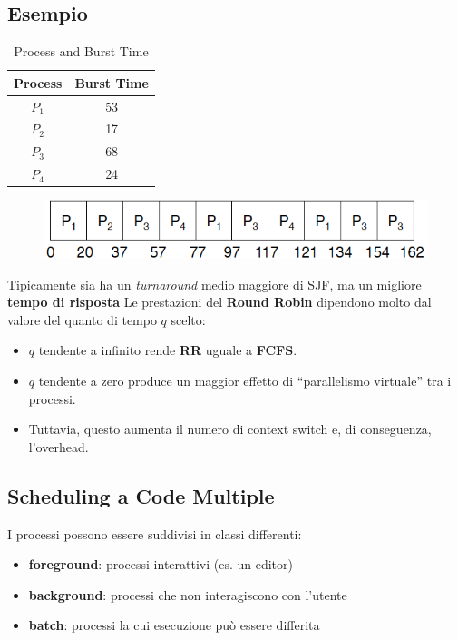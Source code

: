 \subsection{Esempio}
\begin{table}[h]
    \centering
    \begin{tabular}{|c|c|}
        \hline
        \textbf{Process} & \textbf{Burst Time} \\
        \hline
        $P_1$ & 53 \\
        $P_2$ & 17 \\
        $P_3$ & 68 \\
        $P_4$ & 24 \\
        \hline
    \end{tabular}
    \caption{Process and Burst Time}
    \label{tab:process_burst_time}
\end{table}
\begin{figure}[h]
    \centering
    \includegraphics[width=0.25\linewidth]{images/RR_20.png}
\end{figure}
Tipicamente sia ha un \textit{turnaround} medio maggiore di SJF, ma un migliore \textbf{tempo di risposta}
Le prestazioni del \textbf{Round Robin} dipendono molto dal valore del quanto di tempo \( q \) scelto:
\begin{itemize}
    \item \( q \) tendente a infinito rende \textbf{RR} uguale a \textbf{FCFS}.
    \item \( q \) tendente a zero produce un maggior effetto di “parallelismo virtuale” tra i processi.
    \item Tuttavia, questo aumenta il numero di context switch e, di conseguenza, l'overhead.
\end{itemize}

\subsection{Scheduling a Code Multiple}

I processi possono essere suddivisi in classi differenti:
\begin{itemize}
    \item \textbf{foreground}: processi interattivi (es. un editor)
    \item \textbf{background}: processi che non interagiscono con l'utente
    \item \textbf{batch}: processi la cui esecuzione può essere differita
\end{itemize}

